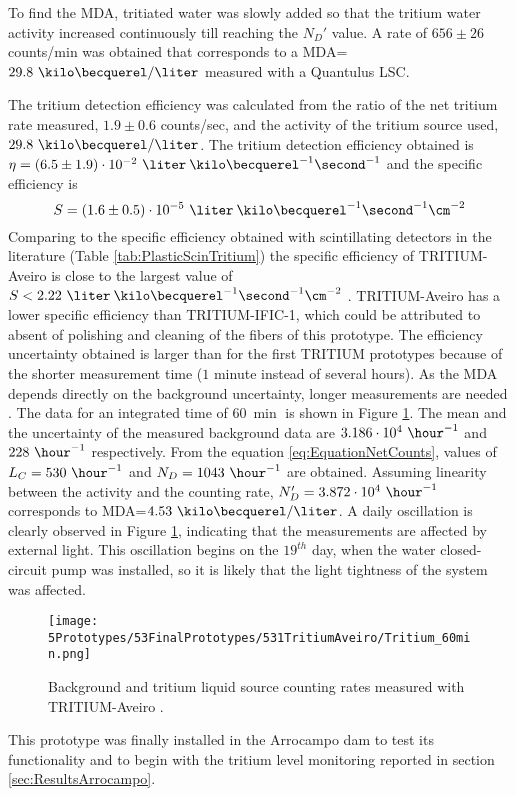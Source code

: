 To find the MDA, tritiated water was slowly added  so that the tritium water activity increased continuously till reaching the $N_D'$ value. A rate of $656 \pm 26$ counts/min was obtained that corresponds to a MDA=$29.8~\kilo\becquerel/\liter$ measured with a Quantulus LSC.

The tritium detection efficiency was calculated from the ratio of the net tritium rate measured, $1.9 \pm 0.6$ counts/sec, and the activity of the tritium source used, $29.8~\kilo\becquerel/\liter$. The tritium detection efficiency obtained is $\eta=(6.5 \pm 1.9)\cdot{} 10^{-2}~\liter\:\kilo\becquerel^{-1}\second^{-1}$ and the specific efficiency is
$$S=(1.6 \pm 0.5)\cdot{} 10^{-5}~\liter\:\kilo\becquerel^{-1}\second^{-1}\cm^{-2}$$ 
Comparing to the specific efficiency obtained with scintillating detectors in the literature (Table \ref{tab:PlasticScinTritium}) the specific efficiency of TRITIUM-Aveiro is close to the largest value of $S<2.22~\liter\:\kilo\becquerel^{-1}\second^{-1}\cm^{-2}$ \cite{Hofstetter1, Hofstetter2}. TRITIUM-Aveiro has a lower specific efficiency than TRITIUM-IFIC-1, which could be attributed to absent of polishing and cleaning of the fibers of this prototype. The efficiency uncertainty obtained is larger than for the first TRITIUM prototypes because of the shorter measurement time ($1$ minute instead of several hours). As the MDA depends directly on the background uncertainty, longer measurements are needed . The data for an integrated time of $60~\min$ is shown in Figure \ref{fig:Tritium60min}. The mean and the uncertainty of the measured background data are $3.186 \cdot{} 10^{4}~\hour^{-1}$ and $228~\hour^{-1}$ respectively. From the equation \ref{eq:EquationNetCounts}, values of $L_C=530~\hour^{-1}$ and $N_D=1043~\hour^{-1}$ are obtained. Assuming linearity between the activity and the counting rate, $N_D'=3.872\cdot{}10^4~\hour^{-1}$ corresponds to MDA=$4.53~\kilo\becquerel/\liter$. A daily oscillation is clearly observed in Figure \ref{fig:Tritium60min}, indicating that the measurements are affected by external light. This oscillation begins on the $19^{th}$ day, when the water closed-circuit pump was installed, so it is likely that the light tightness of the system was affected.
\begin{figure}[h]
\centering
\texttt{[image: 5Prototypes/53FinalPrototypes/531TritiumAveiro/Tritium\_60min.png]}
\caption{Background and tritium liquid source counting rates measured with TRITIUM-Aveiro \cite{ExperimentalPaperCarlos} \label{fig:Tritium60min}.}
\end{figure}
This prototype was finally installed in the Arrocampo dam to test its functionality and to begin with the tritium level monitoring reported in section \ref{sec:ResultsArrocampo}.